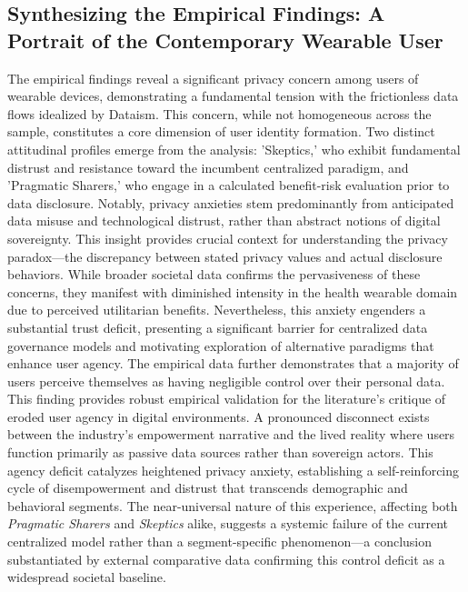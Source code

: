 \subsection{Synthesizing the Empirical Findings: A Portrait of the Contemporary Wearable User}
	The empirical findings reveal a significant privacy concern among users of wearable devices, demonstrating a fundamental tension with the frictionless data flows idealized by Dataism. This concern, while not homogeneous across the sample, constitutes a core dimension of user identity formation. Two distinct attitudinal profiles emerge from the analysis: 'Skeptics,' who exhibit fundamental distrust and resistance toward the incumbent centralized paradigm, and 'Pragmatic Sharers,' who engage in a calculated benefit-risk evaluation prior to data disclosure. Notably, privacy anxieties stem predominantly from anticipated data misuse and technological distrust, rather than abstract notions of digital sovereignty. This insight provides crucial context for understanding the privacy paradox—the discrepancy between stated privacy values and actual disclosure behaviors. While broader societal data confirms the pervasiveness of these concerns, they manifest with diminished intensity in the health wearable domain due to perceived utilitarian benefits. Nevertheless, this anxiety engenders a substantial trust deficit, presenting a significant barrier for centralized data governance models and motivating exploration of alternative paradigms that enhance user agency.
	The empirical data further demonstrates that a majority of users perceive themselves as having negligible control over their personal data. This finding provides robust empirical validation for the literature's critique of eroded user agency in digital environments. A pronounced disconnect exists between the industry's empowerment narrative and the lived reality where users function primarily as passive data sources rather than sovereign actors. This agency deficit catalyzes heightened privacy anxiety, establishing a self-reinforcing cycle of disempowerment and distrust that transcends demographic and behavioral segments. The near-universal nature of this experience, affecting both \textit{Pragmatic Sharers} and \textit{Skeptics} alike, suggests a systemic failure of the current centralized model rather than a segment-specific phenomenon—a conclusion substantiated by external comparative data confirming this control deficit as a widespread societal baseline.
